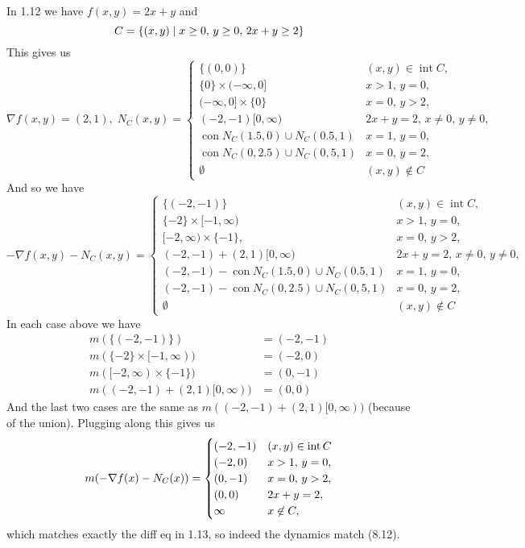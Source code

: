 \documentclass{article}
\newenvironment{ex}[1]
  {\renewcommand\theexercise{#1}\exercise}
  {\endexercise}
\DeclareMathOperator*{\inte}{int}
\DeclareMathOperator*{\con}{con}
\begin{document}
\begin{ex}{8.12} %
  In 1.12 we have $f(x, y) = 2x + y$ and
  $$
  C = \{ (x, y) \mid x \ge 0, \, y \ge 0, \, 2x + y \ge 2 \}
  $$
  This gives us
  $$
  \nabla f(x, y) = (2, 1), \; N_C(x, y) = \begin{cases}
    \{(0, 0)\} & (x, y) \in \inte C, \\
    \{0\} \times (-\infty, 0] & x > 1, \, y = 0, \\
    (-\infty, 0] \times \{0\} & x = 0, \, y > 2, \\
    (-2, -1)[0, \infty) & 2x + y = 2, \, x \ne 0, \, y \ne 0, \\
    \con N_C(1.5, 0) \cup N_C(0.5, 1) & x = 1, \, y = 0, \\
    \con N_C(0, 2.5) \cup N_C(0, 5, 1) & x =0, \, y = 2, \\
    \emptyset & (x, y) \not\in C
  \end{cases}
  $$
  And so we have
  $$
  -\nabla f(x, y) - N_C(x, y) = \begin{cases}
    \{(-2, -1)\} & (x, y) \in \inte C, \\
    \{-2\} \times [-1, \infty) & x > 1, \, y = 0, \\
    [-2, \infty) \times \{-1\}, & x =0, \, y > 2, \\
    (-2, -1) + (2, 1)[0, \infty) & 2x + y = 2, \, x \ne 0, \, y \ne 0, \\
    (-2, -1) - \con N_C(1.5, 0) \cup N_C(0.5, 1) & x = 1, \, y = 0, \\
    (-2, -1) - \con N_C(0, 2.5) \cup N_C(0, 5, 1) & x =0, \, y = 2, \\
    \emptyset & (x, y) \not\in C
  \end{cases}
  $$
  In each case above we have
  \begin{align*}
    m(\{(-2, -1)\}) &= (-2, -1) \\
    m( \{-2\} \times [-1, \infty) ) &= (-2, 0) \\
    m( [-2, \infty) \times \{-1\} ) &= (0, -1) \\
    m( (-2, -1) + (2, 1)[0, \infty) ) &= (0, 0)
  \end{align*}
  And the last two cases are the same as $m( (-2, -1) + (2, 1)[0, \infty) )$ (because of the union). Plugging along this gives us
  $$
  m\parens{ -\nabla f(x) - N_C(x) } = \begin{cases}
    (-2, -1) & (x, y) \in\inte C \\
    (-2, 0) & x > 1, \, y = 0, \\
    (0, -1) & x = 0, \, y > 2, \\
    (0, 0) & 2x + y = 2, \\
    \infty & x \not\in C,
  \end{cases}
  $$
  which matches exactly the diff eq in 1.13, so indeed the dynamics match (8.12). \, \\


\end{ex}
\end{document}
